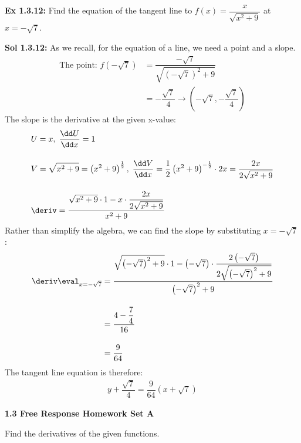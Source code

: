 \begin{tcolorbox}[example]
    \textbf{Ex 1.3.12: } Find the equation of the tangent line to $f(x) = \dfrac{x}{\sqrt{x^2 + 9}}$ at $x = -\sqrt{7}$.
\end{tcolorbox}
\begin{tcolorbox}[solution]
    \textbf{Sol 1.3.12: } As we recall, for the equation of a line, we need a point and a slope. \begin{align*}
        \text{The point: } f\left(-\sqrt{7}\right) & = \dfrac{-\sqrt{7}}{\sqrt{\left(-\sqrt{7}\right)^2 + 9}} \\[11pt]
        & = -\dfrac{\sqrt{7}}{4} \rightarrow \left(-\sqrt{7}, -\dfrac{\sqrt{7}}{4}\right) 
    \end{align*} 
    The slope is the derivative at the given x-value: \begin{align*}
        & U = x, \; \dfrac{\dd U}{\dd x} = 1 \\[11pt]
        & V = \sqrt{x^2 + 9} = \left(x^2 + 9\right)^\frac{1}{2}, \; \dfrac{\dd V}{\dd x} = \dfrac{1}{2}\left(x^2 + 9\right)^{-\frac{1}{2}} \cdot 2x = \dfrac{2x}{2\sqrt{x^2 + 9}} \\[11pt]
        & \deriv = \dfrac{\sqrt{x^2 + 9} \cdot 1 - x \cdot \dfrac{2x}{2\sqrt{x^2 + 9}}}{x^2 + 9} 
    \end{align*} 
    Rather than simplify the algebra, we can find the slope by substituting $x = -\sqrt{7}$: \begin{align*}
        \deriv \eval_{x = -\sqrt{7}} & = \dfrac{\sqrt{\left(-\sqrt{7}\right)^2 + 9} \cdot 1 - \left(-\sqrt{7}\right) \cdot \dfrac{2\left(-\sqrt{7}\right)}{2\sqrt{\left(-\sqrt{7}\right)^2 + 9}}}{\left(-\sqrt{7}\right)^2 + 9} \\[11pt]
        & = \dfrac{4 - \dfrac{7}{4}}{16} \\[11pt]
        & = \dfrac{9}{64}
    \end{align*} 
    The tangent line equation is therefore: \begin{align*}
        \boxed{y + \dfrac{\sqrt{7}}{4} = \dfrac{9}{64}\left(x + \sqrt{7}\right)} 
    \end{align*} 
\end{tcolorbox}

\newpage

\textbf{\large{1.3 Free Response Homework Set A}} \par

Find the derivatives of the given functions. \par

